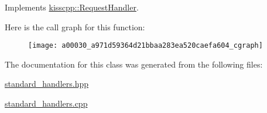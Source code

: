 Implements \hyperlink{a00037_a3606f772c07297826847a8e36226cdaa}{kisscpp\-::\-Request\-Handler}.



Here is the call graph for this function\-:\nopagebreak
\begin{figure}[H]
\begin{center}
\leavevmode
\texttt{[image: a00030\_a971d59364d21bbaa283ea520caefa604\_cgraph]}
\end{center}
\end{figure}




The documentation for this class was generated from the following files\-:\begin{DoxyCompactItemize}
\item 
\hyperlink{a00079}{standard\-\_\-handlers.\-hpp}\item 
\hyperlink{a00078}{standard\-\_\-handlers.\-cpp}\end{DoxyCompactItemize}
